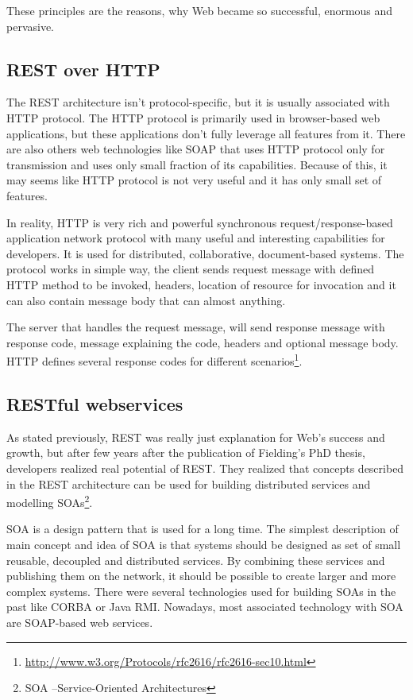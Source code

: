 \documentclass[12pt,final,oneside]{fithesis2}
\begin{document}
These principles are the reasons, why Web became so successful, enormous and pervasive.\cite{resteasy-book}

\subsection{REST over HTTP}
The REST architecture isn't protocol-specific, but it is usually associated with HTTP protocol. The HTTP protocol is primarily used in browser-based web applications, but these applications don't fully leverage all features from it. There are also others web technologies like SOAP that uses HTTP protocol only for transmission and uses only small fraction of its capabilities. Because of this, it may seems like HTTP protocol is not very useful and it has only small set of features. 

In reality, HTTP is very rich and powerful synchronous request/response-based application network protocol with many useful and interesting capabilities for developers. It is used for distributed, collaborative, document-based systems. The protocol works in simple way, the client sends request message with defined HTTP method to be invoked, headers, location of resource for invocation and it can also contain message body that can almost anything.

The server that handles the request message, will send response message with response code, message explaining the code, headers and optional message body. HTTP defines several response codes for different scenarios\footnote{\url{http://www.w3.org/Protocols/rfc2616/rfc2616-sec10.html}}.\cite{resteasy-book}

\subsection{RESTful webservices}
As stated previously, REST was really just explanation for Web's success and growth, but after few years after the publication of Fielding's PhD thesis, developers realized real potential of REST. They realized that concepts described in the REST architecture can be used for building distributed services and modelling SOAs\footnote{SOA --Service-Oriented Architectures}. 

SOA is a design pattern that is used for a long time. The simplest description of main concept and idea of SOA is that systems should be designed as set of small reusable, decoupled and distributed services. By combining these services and publishing them on the network, it should be possible to create larger and more complex systems. There were several technologies used for building SOAs in the past like CORBA or Java RMI. Nowadays, most associated technology with SOA are SOAP-based web services.  
\end{document}
